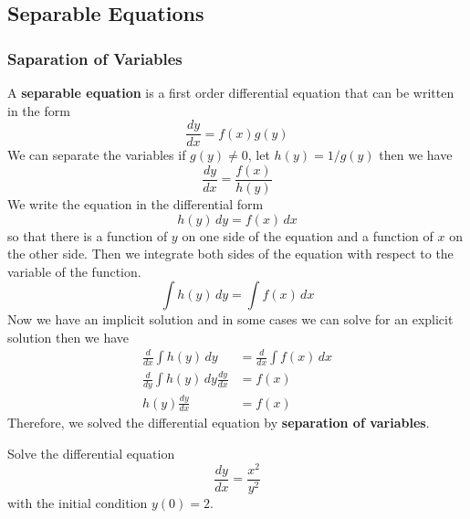 \subsection{Separable Equations}
\subsubsection{Saparation of Variables}
A \textbf{separable equation} is a first order differential equation that can
be written in the form \[\frac{dy}{dx}=f(x)g(y)\]
We can separate the variables if \(g(y)\neq0\), let \(h(y)=1/g(y)\) then we
have \[\frac{dy}{dx}=\frac{f(x)}{h(y)}\]
We write the equation in the differential form \[h(y)\,dy=f(x)\,dx\] so that
there is a function of \(y\) on one side of the equation and a function of
\(x\) on the other side.
Then we integrate both sides of the equation with respect to the variable of
the function.
\[\int h(y)\,dy=\int f(x)\,dx\]
Now we have an implicit solution and in some cases we can solve for an
explicit solution then we have
\begin{align*}
    \frac{d}{dx}\int h(y)\,dy&=\frac{d}{dx}\int f(x)\,dx\\
    \frac{d}{dy}\int h(y)\,dy\frac{dy}{dx}&=f(x)\\h(y)\frac{dy}{dx}&=f(x)
\end{align*}
Therefore, we solved the differential equation by
\textbf{separation of variables}.
\begin{problem}
    Solve the differential equation \[\frac{dy}{dx}=\frac{x^2}{y^2}\] with the
    initial condition \(y(0)=2\).
\end{problem}